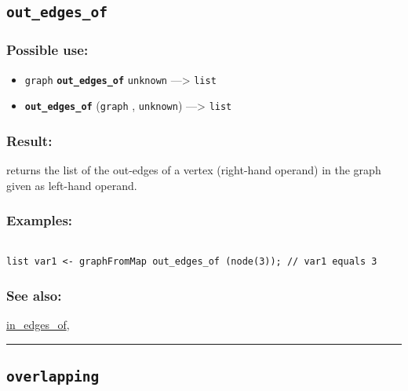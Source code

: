 \documentclass[]{book}
\providecommand{\tightlist}{%
  \setlength{\itemsep}{0pt}\setlength{\parskip}{0pt}}
\theoremstyle{definition}
\theoremstyle{definition}
\theoremstyle{definition}
\theoremstyle{remark}
\begin{document}
\subsection{\texorpdfstring{\texttt{out\_edges\_of}}{out\_edges\_of}}\label{out_edges_of}

\subsubsection{Possible use:}\label{possible-use-389}

\begin{itemize}
\tightlist
\item
  \texttt{graph} \textbf{\texttt{out\_edges\_of}} \texttt{unknown}
  ---\textgreater{} \texttt{list}
\item
  \textbf{\texttt{out\_edges\_of}} (\texttt{graph} , \texttt{unknown})
  ---\textgreater{} \texttt{list}
\end{itemize}

\subsubsection{Result:}\label{result-375}

returns the list of the out-edges of a vertex (right-hand operand) in
the graph given as left-hand operand.

\subsubsection{Examples:}\label{examples-267}

\begin{verbatim}
 
list var1 <- graphFromMap out_edges_of (node(3)); // var1 equals 3
\end{verbatim}

\subsubsection{See also:}\label{see-also-155}

\href{OperatorsIM\#in_edges_of}{in\_edges\_of},

\begin{center}\rule{0.5\linewidth}{\linethickness}\end{center}

\subsection{\texorpdfstring{\texttt{overlapping}}{overlapping}}\label{overlapping}
\end{document}
